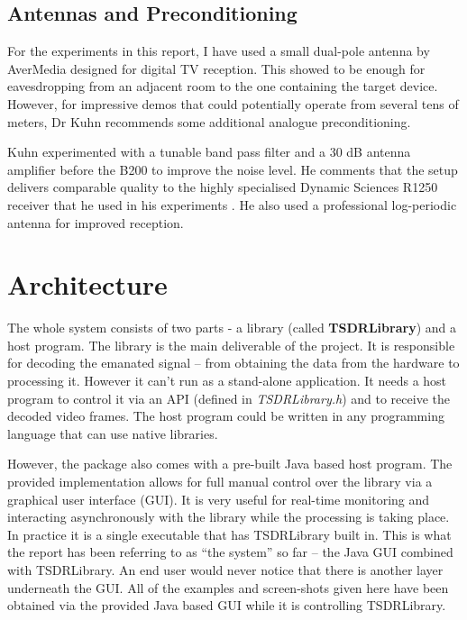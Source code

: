 \documentclass[a4paper,12pt,twoside,openright]{report}
\begin{document}
\subsection{Antennas and Preconditioning}

For the experiments in this report, I have used a small dual-pole antenna by AverMedia designed for digital TV reception. This showed to be enough for eavesdropping from an adjacent room to the one containing the target device. However, for impressive demos that could potentially operate from several tens of meters, Dr Kuhn recommends some additional analogue preconditioning.

Kuhn experimented with a tunable band pass filter and a 30 dB antenna amplifier before the B200 to improve the noise level. He comments that the setup delivers comparable quality to the highly specialised Dynamic Sciences R1250 receiver that he used in his experiments \cite{kuhn2003compromising}. He also used a professional log-periodic antenna for improved reception.

\section{Architecture}

The whole system consists of two parts - a library (called \textbf{TSDRLibrary}) and a host program. The library is the main deliverable of the project. It is responsible for decoding the emanated signal -- from obtaining the data from the hardware to processing it. However it can't run as a stand-alone application. It needs a host program to control it via an API (defined in \textit{TSDRLibrary.h}) and to receive the decoded video frames. The host program could be written in any programming language that can use native libraries.

However, the package also comes with a pre-built Java based host program. The provided implementation allows for full manual control over the library via a graphical user interface (GUI). It is very useful for real-time monitoring and interacting asynchronously with the library while the processing is taking place. In practice it is a single executable that has TSDRLibrary built in. This is what the report has been referring to as ``the system'' so far -- the Java GUI combined with TSDRLibrary. An end user would never notice that there is another layer underneath the GUI. All of the examples and screen-shots given here have been obtained via the provided Java based GUI while it is controlling TSDRLibrary.
\end{document}
